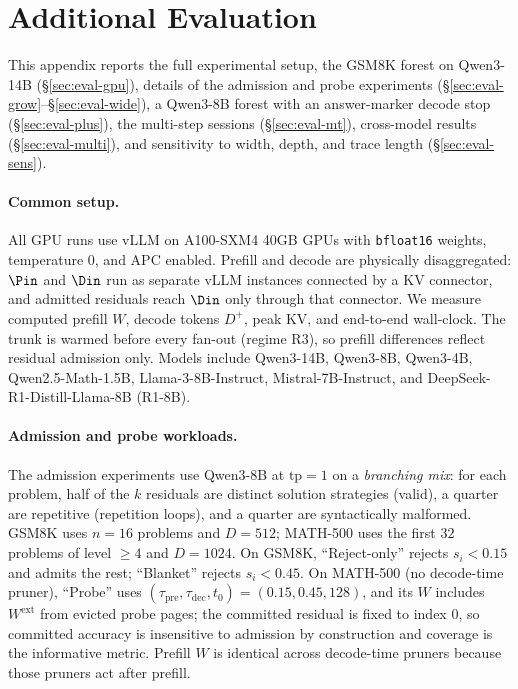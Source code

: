 \section{Additional Evaluation}
\label{sec:eval-full}

This appendix reports the full experimental setup, the GSM8K forest on Qwen3-14B (\S\ref{sec:eval-gpu}), details of the admission and probe experiments (\S\ref{sec:eval-grow}--\S\ref{sec:eval-wide}), a Qwen3-8B forest with an answer-marker decode stop (\S\ref{sec:eval-plus}), the multi-step sessions (\S\ref{sec:eval-mt}), cross-model results (\S\ref{sec:eval-multi}), and sensitivity to width, depth, and trace length (\S\ref{sec:eval-sens}).

\paragraph{Common setup.}
\label{sec:eval-setup}
All GPU runs use vLLM on A100-SXM4 40GB GPUs with \texttt{bfloat16} weights, temperature $0$, and APC enabled.
Prefill and decode are physically disaggregated: $\Pin$ and $\Din$ run as separate vLLM instances connected by a KV connector, and admitted residuals reach $\Din$ only through that connector.
We measure computed prefill $W$, decode tokens $D^{+}$, peak KV, and end-to-end wall-clock.
The trunk is warmed before every fan-out (regime R3), so prefill differences reflect residual admission only.
Models include Qwen3-14B, Qwen3-8B, Qwen3-4B, Qwen2.5-Math-1.5B, Llama-3-8B-Instruct, Mistral-7B-Instruct, and DeepSeek-R1-Distill-Llama-8B (R1-8B).

\paragraph{Admission and probe workloads.}
The admission experiments use Qwen3-8B at $\mathrm{tp}{=}1$ on a \emph{branching mix}: for each problem, half of the $k$ residuals are distinct solution strategies (valid), a quarter are repetitive (repetition loops), and a quarter are syntactically malformed.
GSM8K uses $n{=}16$ problems and $D{=}512$; MATH-500 uses the first $32$ problems of level $\ge4$ and $D{=}1024$.
On GSM8K, ``Reject-only'' rejects $s_i{<}0.15$ and admits the rest; ``Blanket'' rejects $s_i{<}0.45$.
On MATH-500 (no decode-time pruner), ``Probe'' uses $(\tau_{\mathrm{pre}},\tau_{\mathrm{dec}},t_0)=(0.15,0.45,128)$, and its $W$ includes $W^{\mathrm{ext}}$ from evicted probe pages; the committed residual is fixed to index $0$, so committed accuracy is insensitive to admission by construction and coverage is the informative metric.
Prefill $W$ is identical across decode-time pruners because those pruners act after prefill.

